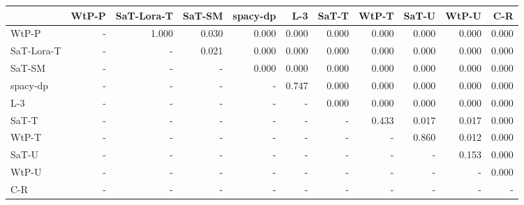 \begin{tabular}{lrrrrrrrrrr}
\toprule
 & WtP-P & SaT-Lora-T & SaT-SM & spacy-dp & L-3 & SaT-T & WtP-T & SaT-U & WtP-U & C-R \\
\midrule
WtP-P & - & 1.000 & 0.030 & 0.000 & 0.000 & 0.000 & 0.000 & 0.000 & 0.000 & 0.000 \\
SaT-Lora-T & - & - & 0.021 & 0.000 & 0.000 & 0.000 & 0.000 & 0.000 & 0.000 & 0.000 \\
SaT-SM & - & - & - & 0.000 & 0.000 & 0.000 & 0.000 & 0.000 & 0.000 & 0.000 \\
spacy-dp & - & - & - & - & 0.747 & 0.000 & 0.000 & 0.000 & 0.000 & 0.000 \\
L-3 & - & - & - & - & - & 0.000 & 0.000 & 0.000 & 0.000 & 0.000 \\
SaT-T & - & - & - & - & - & - & 0.433 & 0.017 & 0.017 & 0.000 \\
WtP-T & - & - & - & - & - & - & - & 0.860 & 0.012 & 0.000 \\
SaT-U & - & - & - & - & - & - & - & - & 0.153 & 0.000 \\
WtP-U & - & - & - & - & - & - & - & - & - & 0.000 \\
C-R & - & - & - & - & - & - & - & - & - & - \\
\bottomrule
\end{tabular}

